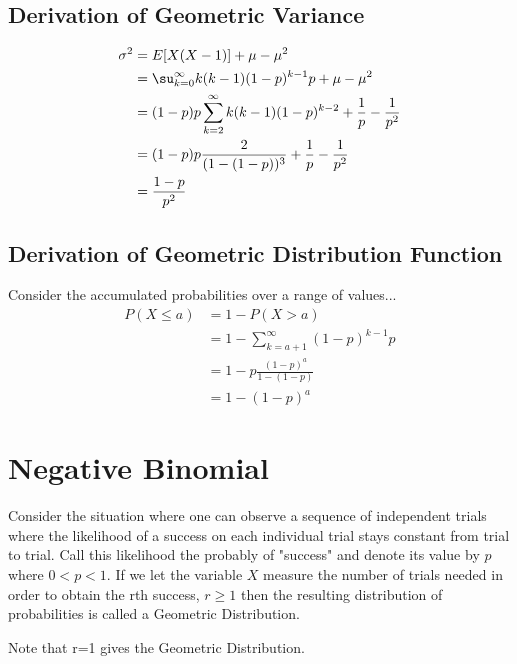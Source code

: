 \documentclass[10pt,]{book}
\theoremstyle{plain}
\theoremstyle{definition}
\theoremstyle{definition}
\numberwithin{equation}{section}
\newcommand{\lt}{ < }
\newcommand{\gt}{ > }
\begin{document}
\subsection[Derivation of Geometric Variance]{Derivation of Geometric Variance}\label{subsection-23}
\begin{align*}
\sigma^2 & = E[X(X-1)] + \mu - \mu^2 \\
 & = \su _{k=0}^{\infty} {k(k-1)(1-p)^{k-1}p} + \mu - \mu^2 \\
 & = (1-p)p \sum_{k=2}^{\infty} {k(k-1)(1-p)^{k-2}} + \frac{1}{p} - \frac{1}{p^2}\\
 & = (1-p)p \frac{2}{(1-(1-p))^3} + \frac{1}{p} - \frac{1}{p^2}\\
 & = \frac{1-p}{p^2}
\end{align*}\typeout{************************************************}
\typeout{************************************************}
\subsection[Derivation of Geometric Distribution Function]{Derivation of Geometric Distribution Function}\label{subsection-24}
 Consider the accumulated probabilities over a range of values...%
\begin{align*}
 P(X \le a) & = 1 - P(X \gt a)\\
 & = 1- \sum_{k={a+1}}^{\infty} {(1-p)^{k-1}p}\\
 & = 1- p \frac{(1-p)^{a}}{1-(1-p)}\\
 & = 1- (1-p)^{a}
\end{align*}\typeout{************************************************}
\typeout{************************************************}
\section[Negative Binomial]{Negative Binomial}\label{section-21}
Consider the situation where one can observe a sequence  of independent
	trials where the likelihood of a success on each individual trial
	stays constant from trial to trial. Call this likelihood the probably of
	"success" and denote its value by \(p\) 
	where \( 0 \lt p \lt 1 \).  
	If we let the variable \(X\) measure the number of trials needed in order
	to obtain the rth success, \(r \ge 1\) 
	then the resulting distribution of probabilities is called a 
	Geometric Distribution.%
\par
Note that r=1 gives the Geometric Distribution.%
\typeout{************************************************}
\typeout{************************************************}
\end{document}
